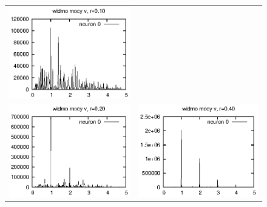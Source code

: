 \documentclass[12pt]{article}
\begin{document}
\begin{figure}
\begin{tabular}{cc}
    \includegraphics{referat_graph/r010.eps} \\
    \includegraphics{referat_graph/r020_2.eps} &
    \includegraphics{referat_graph/r040_2.eps} \\
  \end{tabular}
  \end{figure}
\end{document}
